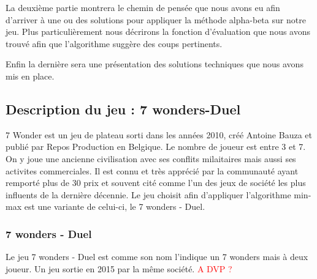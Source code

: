 \documentclass[a4paper, 12pt, french]{article}
\begin{document}
	La deuxième partie montrera le chemin de pensée que nous avons eu afin d'arriver à une ou des solutions pour
	appliquer la méthode alpha-beta sur notre jeu. Plus particulièrement nous décrirons la fonction d'évaluation
	que nous avons trouvé afin que l'algorithme suggère des coups pertinents.

	Enfin la dernière sera une présentation des solutions techniques que nous avons mis en place.

	\subsection{Description du jeu : 7 wonders-Duel}
	7 Wonder est un jeu de plateau sorti dans les années 2010, créé Antoine Bauza et publié par Repos Production en
	Belgique. Le nombre de joueur est entre 3 et 7. On y joue une ancienne
	civilisation avec ses conflits milaitaires mais aussi ses activites commerciales. Il est connu et très apprécié
	par la communauté ayant remporté plus de 30 prix et souvent cité comme l'un des jeux de société les plus influents
	de la dernière décennie\cite{wiki_7_wonder}.
	Le jeu choisit afin d'appliquer l'algorithme min-max est une variante de celui-ci, le 7 wonders - Duel.

	\subsubsection{7 wonders - Duel}
	Le jeu 7 wonders - Duel est comme son nom l'indique un 7 wonders mais à deux joueur. Un jeu sortie en 2015
	par la même société. \textcolor{red}{A DVP ?}
\end{document}
